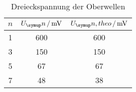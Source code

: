 \begin{table}
  \centering
  \begin{tabular}{c c c}
    \toprule
    $n$ & $U_\su{n}\,/\,\si{\milli\volt}$ & $U_\su{n, theo}\,/\,\si{\milli\volt}$ \\
    \midrule
    1 & 600   &    600  \\
    3 & 150   &    150  \\
    5 & 67    &    67   \\
    7 & 48    &    38   \\
    \bottomrule
  \end{tabular}
  \caption{Dreieckspannung der Oberwellen}
  \label{tab:drei}
\end{table}
